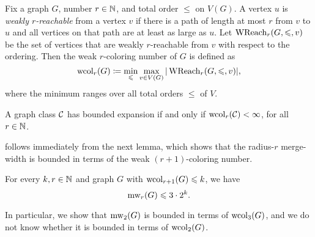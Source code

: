 Fix a graph $G$, number $r\in\mathbb N$, and total order $\le$ on $V(G)$. 
A vertex \(u\) is \emph{weakly \(r\)-reachable} from a vertex \(v\) if there is a path of length at most \(r\) from \(v\) 
to \(u\) and all vertices on that path are at least as large as \(u\).
Let \(\operatorname{WReach}_r(G,\leqslant,v)\) be the set of vertices that are weakly \(r\)-reachable from \(v\) with respect to the ordering.
Then the weak \(r\)-coloring number of \(G\) is defined as
\[
\operatorname{wcol}_r(G) \coloneqq \min_{\leqslant} \max_{v \in V(G)} |\operatorname{WReach}_r(G,\leqslant,v)|,
\]
where the minimum ranges over all total orders $\le$ of $V$.

\begin{lemma}\label{fact:be}
A graph class $\mathcal C$ has bounded expansion if and only if $\operatorname{wcol}_r(\mathcal C)<\infty$, for all~${r\in\mathbb N}$.
\end{lemma}













 follows immediately from the next lemma,
which 
shows that the 
 radius-$r$ merge-width 
is bounded in terms of the weak $(r+1)$-coloring number. 


\begin{lemma}\label{lem:wcol}
  For every $k,r\in\mathbb N$ and graph $G$ with $\operatorname{wcol}_{r+1}(G)\leqslant k$, we have
  $$\operatorname{mw}_r(G)\leqslant 3\cdot 2^{k} .$$
\end{lemma}
In particular, we show that $\operatorname{mw}_2(G)$  is bounded in terms of $\operatorname{wcol}_3(G)$,
and we do not know whether it is bounded in terms of $\operatorname{wcol}_2(G)$.

